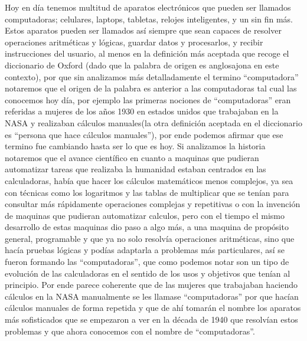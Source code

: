 \documentclass[letterpaper,12pt,oneside]{book}
\begin{document}
	Hoy en día tenemos multitud de aparatos electrónicos que pueden ser llamados computadoras; celulares, laptops, tabletas, relojes inteligentes, y un sin fin más. 
	Estos aparatos pueden ser llamados así siempre que sean  capaces de resolver operaciones aritméticas y lógicas, guardar datos  y procesarlos, y recibir instrucciones del 
	usuario, al menos en la definición
	más aceptada que recoge el diccionario de Oxford (dado que la palabra de origen es anglosajona en este contexto),
	por que sin analizamos más detalladamente el termino ``computadora''  notaremos que el origen de la palabra es anterior a las computadoras
	tal cual las conocemos hoy día, por ejemplo las primeras nociones de ``computadoras''  eran referidas a mujeres de los años 1930 en estados unidos
	que trabajaban en la NASA y realizaban cálculos manuales(la otra definición aceptada en el diccionario es ``persona que hace cálculos manuales''), por ende podemos afirmar que ese termino fue cambiando hasta ser lo que es hoy.
	Si analizamos la historia notaremos que el avance científico en cuanto a maquinas
	que pudieran automatizar tareas que realizaba la humanidad estaban centrados en las calculadoras, había que hacer los cálculos matemáticos menos
	complejos, ya sea con técnicas como los logaritmos y las tablas de multiplicar que se tenían
	para consultar más rápidamente operaciones complejas y repetitivas o con la invención de maquinas que pudieran automatizar calculos, pero con el tiempo el mismo desarrollo de estas maquinas dio paso a algo más,
	a una maquina de propósito general, programable y que ya no solo resolvía operaciones aritméticas, sino que hacía pruebas lógicas y podías
	adaptarla a problemas más particulares, así se fueron formando las ``computadoras'', que como podemos notar son un tipo de evolución de las calculadoras en el sentido de los usos y objetivos
	que tenían al principio. Por ende parece coherente que	de las mujeres que trabajaban haciendo cálculos en la NASA manualmente se les llamase ``computadoras'' por que hacían cálculos manuales
	de forma repetida y que de ahí tomarán el nombre los aparatos más sofisticados que se empezaron a ver en la década de 1940 que resolvían estos problemas y que ahora conocemos con el nombre de ``computadoras''.
	
\end{document}
